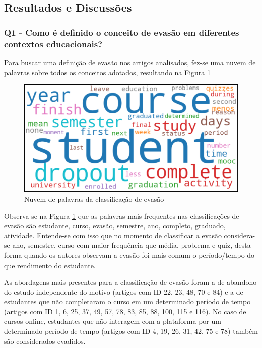 \subsection{Resultados e Discussões}\label{sub:Resultados}

\subsubsection{Q1 - Como é definido o conceito de evasão em diferentes contextos educacionais?}\label{sub:q1}

Para buscar uma definição de evasão nos artigos analisados, fez-se uma nuvem de palavras sobre todos os conceitos adotados, resultando na Figura \ref{fig:nuvemDePalavras}

\begin{figure}[H]
\centering
\includegraphics[width=1\textwidth]{Figuras/100_palavras_dropout.png}
\caption{Nuvem de palavras da classificação de evasão}
\label{fig:nuvemDePalavras}
\end{figure}

Observa-se na Figura \ref{fig:nuvemDePalavras} que as palavras mais frequentes nas classificações de evasão são estudante, curso, evasão, semestre, ano, completo, graduado, atividade. Entende-se com isso que no momento de classificar a evasão considera-se ano, semestre, curso com maior frequência que média, problema e quiz, desta forma quando os autores observam a evasão foi mais comum o período/tempo do que rendimento do estudante.

As abordagens mais presentes para a classificação de evasão foram a de abandono do estudo independente do motivo (artigos com ID 22, 23, 48, 70 e 84) e a de estudantes que não completaram o curso em um determinado período de tempo (artigos com ID 1, 6, 25, 37, 49, 57, 78, 83, 85, 88, 100, 115 e 116). No caso de cursos online, estudantes que não interagem com a plataforma por um determinado período de tempo (artigos com ID 4, 19, 26, 31, 42, 75 e 78) também são considerados evadidos.

